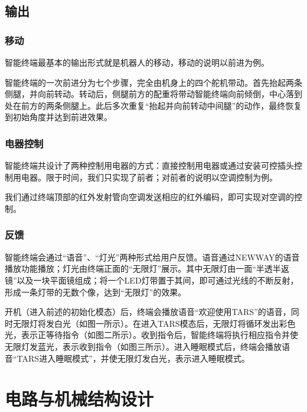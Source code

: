     \subsection{输出}
    \subsubsection{移动}
    \hspace{1.5em}智能终端最基本的输出形式就是机器人的移动，移动的说明以前进为例。
    
    \hspace{1.5em}智能终端的一次前进分为七个步骤，完全由机身上的四个舵机带动。首先抬起两条侧腿，并向前转动。转动后，侧腿前方的配重将带动智能终端向前倾倒，中心落到处在前方的两条侧腿上。此后多次重复“抬起并向前转动中间腿”的动作，最终恢复到初始角度并达到前进效果。

    \subsubsection{电器控制}
    \hspace{1.5em}智能终端共设计了两种控制用电器的方式：直接控制用电器或通过安装可控插头控制用电器。限于时间，我们只实现了前者；对前者的说明以空调控制为例。

    \hspace{1.5em}我们通过终端顶部的红外发射管向空调发送相应的红外编码，即可实现对空调的控制。

    \subsubsection{反馈}
    \hspace{1.5em}智能终端会通过“语音”、“灯光”两种形式给用户反馈。语音通过NEWWAY的语音播放功能播放；灯光由终端正面的“无限灯”展示。其中无限灯由一面“半透半返镜”以及一块平面镜组成；将一个LED灯带置于其间，即可通过光线的不断反射，形成一条灯带的无数个像，达到“无限灯”的效果。
    
    \hspace{1.5em}开机（进入前述的初始化模态）后，终端会播放语音“欢迎使用TARS”的语音，同时无限灯将发白光（如图一所示）。在进入TARS模态后，无限灯将循环发出彩色光，表示正等待指令（如图二所示）。收到指令后，智能终端将执行相应指令并使无限灯发蓝光，表示收到指令（如图三所示）。进入睡眠模式后，终端会播放语音“TARS进入睡眠模式”，并使无限灯发白光，表示进入睡眠模式。

\section{电路与机械结构设计}

